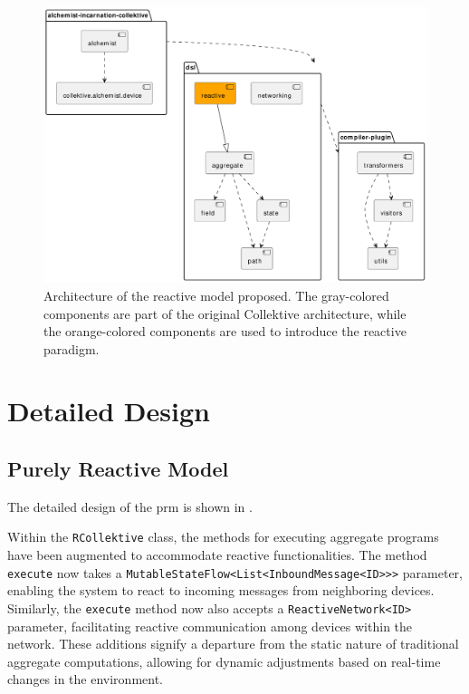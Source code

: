 \begin{figure}
    \centering
    \includegraphics[width=\linewidth]{figures/collektive-prm-architecture.pdf}
    \caption{Architecture of the reactive model proposed. The gray-colored components are part of the original Collektive architecture, while the orange-colored components are used to introduce the reactive paradigm.}
    \label{fig:collektive-prm-architecture}
\end{figure}

\section{Detailed Design}
\label{section:detailed-design}

\subsection{Purely Reactive Model}
\label{subsection:purely-reactive-model}

The detailed design of the \ac{prm} is shown in .

Within the \texttt{RCollektive} class, the methods for executing aggregate programs have been augmented to accommodate reactive functionalities. The method \texttt{execute} now takes a \texttt{MutableStateFlow<List<InboundMessage<ID>>>} parameter, enabling the system to react to incoming messages from neighboring devices. Similarly, the \texttt{execute} method now also accepts a \texttt{ReactiveNetwork<ID>} parameter, facilitating reactive communication among devices within the network. These additions signify a departure from the static nature of traditional aggregate computations, allowing for dynamic adjustments based on real-time changes in the environment.

